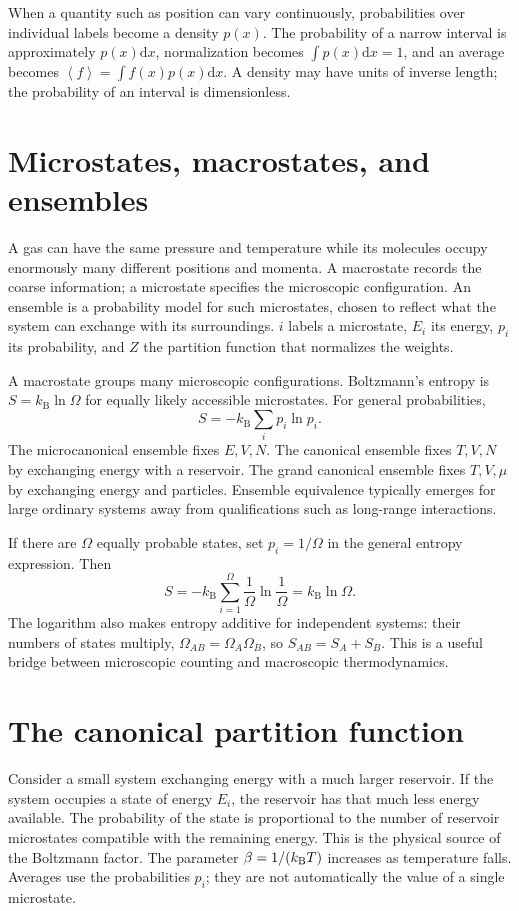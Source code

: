 \documentclass[11pt,oneside]{book}
\newcommand{\dd}{\mathrm{d}}
\newcommand{\avg}[1]{\left\langle #1\right\rangle}
\newcommand{\kb}{k_{\mathrm B}}
\theoremstyle{reviewstyle}
\begin{document}
When a quantity such as position can vary continuously, probabilities over individual labels become a density $p(x)$. The probability of a narrow interval is approximately $p(x)\dd x$, normalization becomes $\int p(x)\dd x=1$, and an average becomes $\avg{f}=\int f(x)p(x)\dd x$. A density may have units of inverse length; the probability of an interval is dimensionless.

\section{Microstates, macrostates, and ensembles}
A gas can have the same pressure and temperature while its molecules occupy enormously many different positions and momenta. A macrostate records the coarse information; a microstate specifies the microscopic configuration. An ensemble is a probability model for such microstates, chosen to reflect what the system can exchange with its surroundings. $i$ labels a microstate, $E_i$ its energy, $p_i$ its probability, and $Z$ the partition function that normalizes the weights.

A macrostate groups many microscopic configurations. Boltzmann's entropy is $S=\kb\ln\Omega$ for equally likely accessible microstates. For general probabilities,
\begin{equation}S=-\kb\sum_i p_i\ln p_i.\end{equation}
The microcanonical ensemble fixes $E,V,N$. The canonical ensemble fixes $T,V,N$ by exchanging energy with a reservoir. The grand canonical ensemble fixes $T,V,\mu$ by exchanging energy and particles. Ensemble equivalence typically emerges for large ordinary systems away from qualifications such as long-range interactions.

If there are $\Omega$ equally probable states, set $p_i=1/\Omega$ in the general entropy expression. Then
\begin{equation}
S=-\kb\sum_{i=1}^{\Omega}\frac1\Omega\ln\frac1\Omega
=\kb\ln\Omega.
\end{equation}
The logarithm also makes entropy additive for independent systems: their numbers of states multiply, $\Omega_{AB}=\Omega_A\Omega_B$, so $S_{AB}=S_A+S_B$. This is a useful bridge between microscopic counting and macroscopic thermodynamics.

\section{The canonical partition function}
Consider a small system exchanging energy with a much larger reservoir. If the system occupies a state of energy $E_i$, the reservoir has that much less energy available. The probability of the state is proportional to the number of reservoir microstates compatible with the remaining energy. This is the physical source of the Boltzmann factor. The parameter $\beta=1/(k_{\rm B}T)$ increases as temperature falls. Averages use the probabilities $p_i$; they are not automatically the value of a single microstate.
\end{document}
